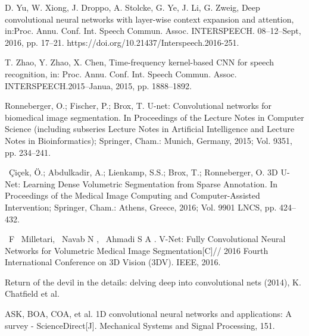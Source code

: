 \documentclass[15pt]{article}
\begin{document}
\begin{thebibliography}{99}
 D. Yu, W. Xiong, J. Droppo, A. Stolcke, G. Ye, J. Li, G. Zweig, Deep convolutional neural networks with layer-wise context expansion and attention, in:Proc. Annu. Conf. Int. Speech Commun. Assoc. INTERSPEECH. 08–12–Sept, 2016, pp. 17–21. https://doi.org/10.21437/Interspeech.2016-251.

 T. Zhao, Y. Zhao, X. Chen, Time-frequency kernel-based CNN for speech recognition, in: Proc. Annu. Conf. Int. Speech Commun. Assoc. INTERSPEECH.2015–Janua, 2015, pp. 1888–1892.

 Ronneberger, O.; Fischer, P.; Brox, T. U-net: Convolutional networks for biomedical image segmentation. In Proceedings of the Lecture Notes in Computer Science (including subseries Lecture Notes in Artificial Intelligence and Lecture Notes in Bioinformatics); Springer, Cham.: Munich, Germany, 2015; Vol. 9351, pp. 234–241.

 Çiçek, Ö.; Abdulkadir, A.; Lienkamp, S.S.; Brox, T.; Ronneberger, O. 3D U-Net: Learning Dense Volumetric Segmentation from Sparse Annotation. In Proceedings of the Medical Image Computing and Computer-Assisted Intervention; Springer, Cham.: Athens, Greece, 2016; Vol. 9901 LNCS, pp. 424–432.

 F  Milletari,  Navab N ,  Ahmadi S A . V-Net: Fully Convolutional Neural Networks for Volumetric Medical Image Segmentation[C]// 2016 Fourth International Conference on 3D Vision (3DV). IEEE, 2016.


 Return of the devil in the details: delving deep into convolutional nets (2014), K. Chatfield et al.

 ASK, BOA, COA, et al. 1D convolutional neural networks and applications: A survey - ScienceDirect[J]. Mechanical Systems and Signal Processing, 151. 

\end{thebibliography}
\end{document}

